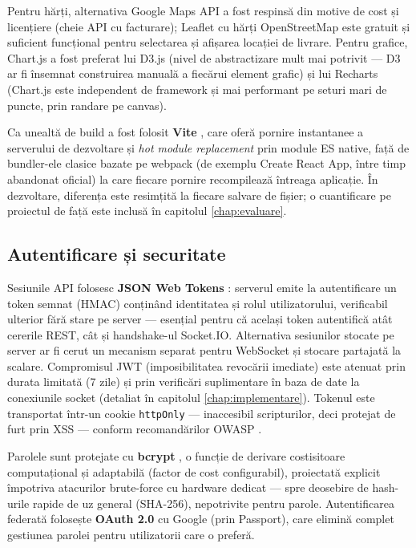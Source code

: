 Pentru hărți, alternativa Google Maps API a fost respinsă din motive de cost și licențiere (cheie API cu facturare); Leaflet cu hărți OpenStreetMap este gratuit și suficient funcțional pentru selectarea și afișarea locației de livrare. Pentru grafice, Chart.js a fost preferat lui D3.js (nivel de abstractizare mult mai potrivit --- D3 ar fi însemnat construirea manuală a fiecărui element grafic) și lui Recharts (Chart.js este independent de framework și mai performant pe seturi mari de puncte, prin randare pe canvas).

Ca unealtă de build a fost folosit \textbf{Vite} \cite{vitedocs}, care oferă pornire instantanee a serverului de dezvoltare și \textit{hot module replacement} prin module ES native, față de bundler-ele clasice bazate pe webpack (de exemplu Create React App, între timp abandonat oficial) la care fiecare pornire recompilează întreaga aplicație. În dezvoltare, diferența este resimțită la fiecare salvare de fișier; o cuantificare pe proiectul de față este inclusă în capitolul \ref{chap:evaluare}.

\subsection{Autentificare și securitate}

Sesiunile API folosesc \textbf{JSON Web Tokens} \cite{rfc7519}: serverul emite la autentificare un token semnat (HMAC) conținând identitatea și rolul utilizatorului, verificabil ulterior fără stare pe server --- esențial pentru că același token autentifică atât cererile REST, cât și handshake-ul Socket.IO. Alternativa sesiunilor stocate pe server ar fi cerut un mecanism separat pentru WebSocket și stocare partajată la scalare. Compromisul JWT (imposibilitatea revocării imediate) este atenuat prin durata limitată (7 zile) și prin verificări suplimentare în baza de date la conexiunile socket (detaliat în capitolul \ref{chap:implementare}). Tokenul este transportat într-un cookie \texttt{httpOnly} --- inaccesibil scripturilor, deci protejat de furt prin XSS --- conform recomandărilor OWASP \cite{owasp2021}.

Parolele sunt protejate cu \textbf{bcrypt} \cite{provos1999}, o funcție de derivare costisitoare computațional și adaptabilă (factor de cost configurabil), proiectată explicit împotriva atacurilor brute-force cu hardware dedicat --- spre deosebire de hash-urile rapide de uz general (SHA-256), nepotrivite pentru parole. Autentificarea federată folosește \textbf{OAuth 2.0} cu Google (prin Passport), care elimină complet gestiunea parolei pentru utilizatorii care o preferă.

